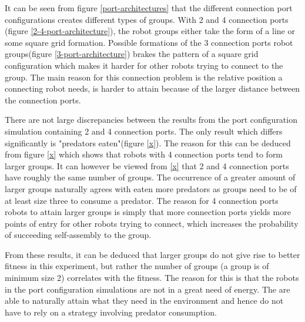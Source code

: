 It can be seen from figure \ref{port-architectures} that the different connection port configurations creates different types of groups. 
With 2 and 4 connection ports (figure \ref{2-4-port-architecture}), the robot groups either take the form of a line or some square grid formation.
Possible formations of the 3 connection ports robot groups(figure \ref{3-port-architecture}) brakes the pattern of a square grid configuration which makes it harder for other robots trying to connect to the group.
The main reason for this connection problem is the relative position a connecting robot needs, is harder to attain because of the larger distance between the connection ports.

There are not large discrepancies between the results from the port configuration simulation containing 2 and 4 connection ports.
The only result which differs significantly is "predators eaten"(figure \ref{x}).
The reason for this can be deduced from figure \ref{x} which shows that robots with 4 connection ports tend to form larger groups.
It can however be viewed from \ref{x} that 2 and 4 connection ports have roughly the same number of groups.
The occurrence of a greater amount of larger groups naturally agrees with eaten more predators as groups need to be of at least size three to consume a predator.
The reason for 4 connection ports robots to attain larger groups is simply that more connection ports yields more points of entry for other robots trying to connect, which increases the probability of succeeding self-assembly to the group.

From these results, it can be deduced that larger groups do not give rise to better fitness in this experiment, but rather the number of groups (a group is of minimum size 2) correlates with the fitness.
The reason for this is that the robots in the port configuration simulations are not in a great need of energy.
The are able to naturally attain what they need in the environment and hence do not have to rely on a strategy involving predator consumption.

























